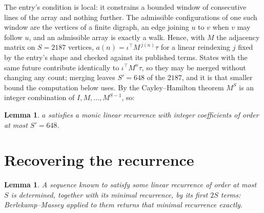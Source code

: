 \documentclass[11pt,a4paper]{article}
\theoremstyle{plain}
\newtheorem{lemma}[theorem]{Lemma}
\theoremstyle{definition}
\begin{document}
The entry's condition is local: it constrains a bounded window of consecutive lines of the
array and nothing further. The admissible configurations of one such window are the vertices
of a finite digraph, an edge joining $u$ to $v$ when $v$ may follow $u$, and an admissible
array is exactly a walk. Hence, with $M$ the adjacency matrix on $S=2187$ vertices,
$a(n)=\iota^{\!\top}M^{\,j(n)}\tau$ for a linear reindexing $j$ fixed by the entry's shape
and checked against its published terms. States with the same future contribute identically to $\iota^{\!\top}M^n\tau$, so they may be merged without changing any count; merging leaves $S'=648$ of the $2187$, and it is that smaller bound the computation below uses. By the Cayley--Hamilton theorem $M^{S}$ is an
integer combination of $I,M,\dots,M^{S-1}$, so:

\begin{lemma}\label{lem:cf}
$a$ satisfies a monic linear recurrence with integer coefficients of order at most
$S'=648$.
\end{lemma}

\section{Recovering the recurrence}

\begin{lemma}\label{lem:bm}
A sequence known to satisfy some linear recurrence of order at most $S$ is determined, together
with its minimal recurrence, by its first $2S$ terms: Berlekamp--Massey applied to them returns
that minimal recurrence exactly.
\end{lemma}
\end{document}
